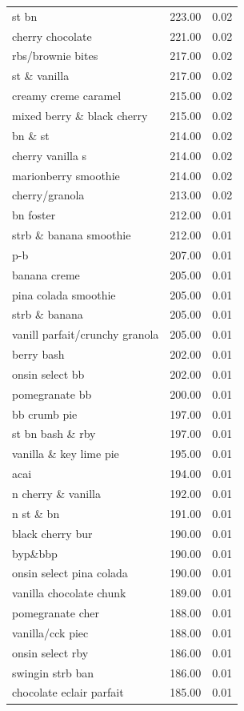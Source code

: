 \begin{table}
\begin{tabular}{lrr}
st bn & 223.00 & 0.02 \\
cherry chocolate & 221.00 & 0.02 \\
rbs/brownie bites & 217.00 & 0.02 \\
st \& vanilla & 217.00 & 0.02 \\
creamy creme caramel & 215.00 & 0.02 \\
mixed berry \& black cherry & 215.00 & 0.02 \\
bn \& st & 214.00 & 0.02 \\
cherry vanilla s & 214.00 & 0.02 \\
marionberry smoothie & 214.00 & 0.02 \\
cherry/granola & 213.00 & 0.02 \\
bn foster & 212.00 & 0.01 \\
strb \& banana smoothie & 212.00 & 0.01 \\
p-b & 207.00 & 0.01 \\
banana creme & 205.00 & 0.01 \\
pina colada smoothie & 205.00 & 0.01 \\
strb \& banana & 205.00 & 0.01 \\
vanill parfait/crunchy granola & 205.00 & 0.01 \\
berry bash & 202.00 & 0.01 \\
onsin select bb & 202.00 & 0.01 \\
pomegranate bb & 200.00 & 0.01 \\
bb crumb pie & 197.00 & 0.01 \\
st bn bash \& rby & 197.00 & 0.01 \\
vanilla \& key lime pie & 195.00 & 0.01 \\
acai & 194.00 & 0.01 \\
n cherry \& vanilla & 192.00 & 0.01 \\
n st \& bn & 191.00 & 0.01 \\
black cherry bur & 190.00 & 0.01 \\
byp\&bbp & 190.00 & 0.01 \\
onsin select pina colada & 190.00 & 0.01 \\
vanilla chocolate chunk & 189.00 & 0.01 \\
pomegranate cher & 188.00 & 0.01 \\
vanilla/cck piec & 188.00 & 0.01 \\
onsin select rby & 186.00 & 0.01 \\
swingin strb ban & 186.00 & 0.01 \\
chocolate eclair parfait & 185.00 & 0.01 \\

\end{tabular}
\end{table}
